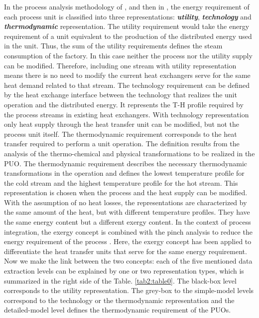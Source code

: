 In the process analysis methodology of \citet{brown2005dual}, \citet{muller2007energy} and then in \citet{Perin-Levasseur2009}, the energy requirement of each process unit is classified into three representations: \textbf{\textit{utility}}, \textbf{\textit{technology}} and \textbf{\textit{thermodynamic}} representation. The utility requirement would take the energy requirement of a unit equivalent to the production of the distributed energy used in the unit. Thus, the sum of the utility requirements defines the steam consumption of the factory. In this case neither the process nor the utility supply can be modified. Therefore, including one stream with utility representation means there is no need to modify the current heat exchangers serve for the same heat demand related to that stream. The technology requirement can be defined by the heat exchange interface between the technology that realizes the unit operation and the distributed energy. It represents the T-H profile required by the process streams in existing heat exchangers. With technology representation only heat supply through the heat transfer unit can be modified, but not the process unit itself. The thermodynamic requirement corresponds to the heat transfer required to perform a unit operation. The definition results from the analysis of the thermo-chemical and physical transformations to be realized in the PUO. The thermodynamic requirement describes the necessary thermodynamic transformations in the operation and defines the lowest temperature profile for the cold stream and the highest temperature profile for the hot stream. This representation is chosen when the process and the heat supply can be modified. With the assumption of no heat losses, the representations are characterized by the same amount of the heat, but with different temperature profiles. They have the same energy content but a  different exergy content.  In the context of process integration, the exergy concept is combined with the pinch analysis to reduce the energy requirement of the process \cite{LENI-ARTICLE-1996-002}. Here, the exergy concept has been applied to differentiate the heat transfer units that serve for the same energy requirement. Now we make the link between the two concepts: each of the five mentioned data extraction levels can be explained by one or two representation types, which is summarized in the right side of the Table. \ref{tab2:table0}. The black-box level corresponds to the utility representation. The grey-box to the simple-model levels correspond to the technology or the thermodynamic representation and the detailed-model level defines the thermodynamic requirement of the PUOs. 

